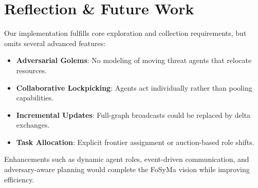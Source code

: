 \documentclass[a4paper,11pt]{article}
\begin{document}
\section{Reflection \& Future Work}
Our implementation fulfills core exploration and collection requirements, but omits several advanced features:
\begin{itemize}
  \item \textbf{Adversarial Golems}: No modeling of moving threat agents that relocate resources.
  \item \textbf{Collaborative Lockpicking}: Agents act individually rather than pooling capabilities.
  \item \textbf{Incremental Updates}: Full-graph broadcasts could be replaced by delta exchanges.
  \item \textbf{Task Allocation}: Explicit frontier assignment or auction-based role shifts.
\end{itemize}

Enhancements such as dynamic agent roles, event-driven communication, and adversary-aware planning would complete the FoSyMa vision while improving efficiency.
\end{document}
